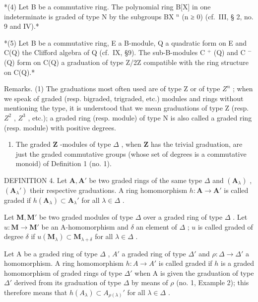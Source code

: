 *(4) Let B be a commutative ring. The polynomial ring B{[}X{]} in one indeterminate is graded of type N by the subgroups BX \(^{n}\) (n ≥ 0) (cf.~III, § 2, no. 9 and IV).*

*(5) Let B be a commutative ring, E a B-module, Q a quadratic form on E and C(Q) the Clifford algebra of Q (cf.~IX, §9). The sub-B-modules C \(^{+}\) (Q) and C \(^{-}\) (Q) form on C(Q) a graduation of type Z/2Z compatible with the ring structure on C(Q).*

Remarks. (1) The graduations most often used are of type Z or of type \(Z^{n}\) ; when we speak of graded (resp. bigraded, trigraded, etc.) modules and rings without mentioning the type, it is understood that we mean graduations of type Z (resp. \(Z^{2}\) , \(Z^{3}\) , etc.); a graded ring (resp. module) of type N is also called a graded ring (resp. module) with positive degrees.

\begin{enumerate}
\def\labelenumi{(\arabic{enumi})}
\setcounter{enumi}{1}
\tightlist
\item
  The graded \(\mathbf{Z}\) -modules of type \(\Delta\) , when \(\mathbf{Z}\) has the trivial graduation, are just the graded commutative groups (whose set of degrees is a commutative monoid) of Definition 1 (no. 1).
\end{enumerate}

DEFINITION 4. Let \(\mathbf{A}, \mathbf{A}'\) be two graded rings of the same type \(\Delta\) and \((\mathbf{A}_{\lambda})\) , \((\mathbf{A}_{\lambda}')\) their respective graduations. A ring homomorphism \(h: \mathbf{A} \to \mathbf{A}'\) is called graded if \(h(\mathbf{A}_{\lambda}) \subset \mathbf{A}_{\lambda}'\) for all \(\lambda \in \Delta\) .

Let \(\mathbf{M}, \mathbf{M}'\) be two graded modules of type \(\Delta\) over a graded ring of type \(\Delta\) . Let \(u: \mathbf{M} \to \mathbf{M}'\) be an A-homomorphism and \(\delta\) an element of \(\Delta\) ; \(u\) is called graded of degree \(\delta\) if \(u(\mathbf{M}_{\lambda}) \subset \mathbf{M}_{\lambda + \delta}\) for all \(\lambda \in \Delta\) .

Let A be a graded ring of type \(\Delta\) , \(A'\) a graded ring of type \(\Delta'\) and \(\rho: \Delta \to \Delta'\) a homomorphism. A ring homomorphism \(h: A \to A'\) is called graded if \(h\) is a graded homomorphism of graded rings of type \(\Delta'\) when A is given the graduation of type \(\Delta'\) derived from its graduation of type \(\Delta\) by means of \(\rho\) (no. 1, Example 2); this therefore means that \(h(A_{\lambda}) \subset A_{\rho(\lambda)}'\) for all \(\lambda \in \Delta\) .

